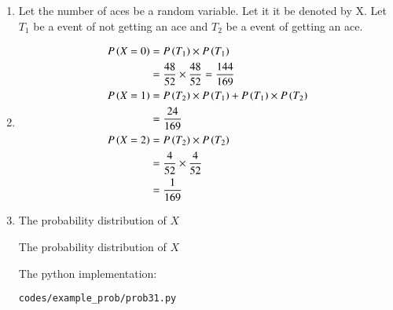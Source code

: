 \renewcommand{\theequation}{\theenumi}
\begin{enumerate}

\item Let the number of aces  be a random variable. Let it it be denoted by X. Let $T_{1}$ be a event of not getting an ace and $T_{2}$ be a event of getting an ace. 

\item 
\begin{align*}
P\left(X=0\right) &= P\left(T_{1}\right) \times P\left(T_{1}\right) \\
&= \frac{48}{52} \times \frac{48}{52} = \frac{144}{169} \\ 
P\left(X=1\right) &=  P\left(T_{2}\right) \times  P\left(T_{1}\right) + P\left(T_{1}\right) \times P\left(T_{2}\right) \\
&= \frac{24}{169} \\
P\left(X=2\right) &= P\left(T_{2}\right) \times P\left(T_{2}\right) \\
&= \frac{4}{52} \times \frac{4}{52}\\
&= \frac{1}{169}\\
\end{align*}

\item The probability distribution of $X$ \\
\begin{table}[ht!]
\centering

\caption{The probability distribution of $X$}
\end{table} 
 

The python implementation:
\begin{lstlisting}
codes/example_prob/prob31.py
\end{lstlisting}

\end{enumerate}